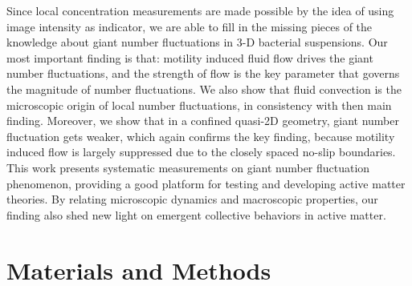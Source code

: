 \documentclass[twocolumn,aps,pre,amsmath,amssymb,longbibliography]{revtex4-1}
\begin{document}
Since local concentration measurements are made possible by the idea of using image intensity as indicator, we are able to fill in the missing pieces of the knowledge about giant number fluctuations in 3-D bacterial suspensions. Our most important finding is that: motility induced fluid flow drives the giant number fluctuations, and the strength of flow is the key parameter that governs the magnitude of number fluctuations. We also show that fluid convection is the microscopic origin of local number fluctuations, in consistency with then main finding. Moreover, we show that in a confined quasi-2D geometry, giant number fluctuation gets weaker, which again confirms the key finding, because motility induced flow is largely suppressed due to the closely spaced no-slip boundaries. This work presents systematic measurements on giant number fluctuation phenomenon, providing a good platform for testing and developing active matter theories. By relating microscopic dynamics and macroscopic properties, our finding also shed new light on emergent collective behaviors in active matter.
%



\section{Materials and Methods}
\label{sec:method}
\end{document}
